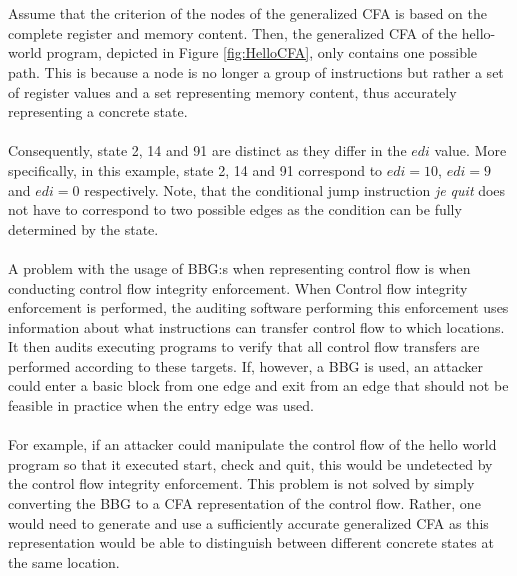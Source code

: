\documentclass{kththesis}
\renewcommand{\it}[1]{\textit{#1}}
\begin{document}
\\ \\
Assume that the criterion of the nodes of the generalized CFA is based on the complete register and memory content. Then, the generalized CFA of the hello-world program, depicted in Figure \ref{fig:HelloCFA}, only contains one possible path. This is because a node is no longer a group of instructions but rather a set of register values and a set representing memory content, thus accurately representing a concrete state. 
\\ \\
Consequently, state 2, 14 and 91 are distinct as they differ in the $edi$ value. More specifically, in this example, state 2, 14 and 91 correspond to $edi=10$, $edi=9$ and $edi=0$ respectively. Note, that the conditional jump instruction \it{je quit} does not have to correspond to two possible edges as the condition can be fully determined by the state.
\\ \\
A problem with the usage of BBG:s when representing control flow is when conducting control flow integrity enforcement\cite{CFIEnforcement}. When Control flow integrity enforcement is performed, the auditing software performing this enforcement uses information about what instructions can transfer control flow to which locations. It then audits executing programs to verify that all control flow transfers are performed according to these targets. If, however, a BBG is used, an attacker could enter a basic block from one edge and exit from an edge that should not be feasible in practice when the entry edge was used. 
\\ \\
For example, if an attacker could manipulate the control flow of the hello world program so that it executed start, check and quit, this would be undetected by the control flow integrity enforcement. This problem is not solved by simply converting the BBG to a CFA representation of the control flow. Rather, one would need to generate and use a sufficiently accurate generalized CFA as this representation would be able to distinguish between different concrete states at the same location.
\end{document}
